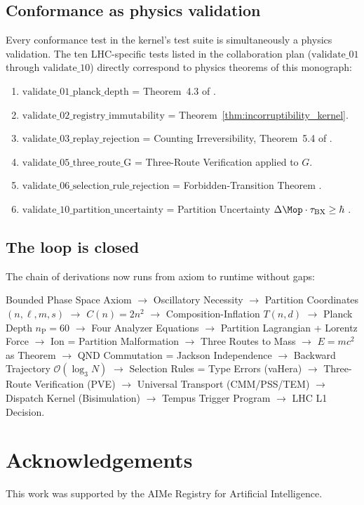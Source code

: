 \documentclass[twocolumn,10pt,a4paper]{article}
\theoremstyle{thmstyle}
\theoremstyle{definition}
\theoremstyle{remark}
\newcommand{\nP}{n_{\mathrm{P}}}
\newcommand{\tBX}{\tau_{\mathrm{BX}}}
\begin{document}
\subsection{Conformance as physics validation}

Every conformance test in the kernel's test suite is simultaneously a
physics validation. The ten LHC-specific tests listed in the collaboration
plan ($\mathrm{validate\_01}$ through $\mathrm{validate\_10}$) directly
correspond to physics theorems of this monograph:
\begin{enumerate}[nosep]
\item $\mathrm{validate\_01\_planck\_depth}$ = Theorem~4.3 of \citet{companion:planck}.
\item $\mathrm{validate\_02\_registry\_immutability}$ = Theorem~\ref{thm:incorruptibility_kernel}.
\item $\mathrm{validate\_03\_replay\_rejection}$ = Counting Irreversibility,
  Theorem~5.4 of \citet{companion:qnd}.
\item $\mathrm{validate\_05\_three\_route\_G}$ = Three-Route Verification
  \citep{companion:verification} applied to $G$.
\item $\mathrm{validate\_06\_selection\_rule\_rejection}$ = Forbidden-Transition
  Theorem \citep{companion:types}.
\item $\mathrm{validate\_10\_partition\_uncertainty}$ = Partition Uncertainty
  $\Delta\Mop \cdot \tBX \geq \hbar$ \citep{companion:spectrometer}.
\end{enumerate}

\subsection{The loop is closed}

The chain of derivations now runs from axiom to runtime without gaps:
\begin{center}
\footnotesize
Bounded Phase Space Axiom
$\to$ Oscillatory Necessity
$\to$ Partition Coordinates $(n,\ell,m,s)$
$\to$ $C(n) = 2n^2$
$\to$ Composition-Inflation $T(n,d)$
$\to$ Planck Depth $\nP = 60$
$\to$ Four Analyzer Equations
$\to$ Partition Lagrangian + Lorentz Force
$\to$ Ion = Partition Malformation
$\to$ Three Routes to Mass
$\to$ $E = mc^2$ as Theorem
$\to$ QND Commutation = Jackson Independence
$\to$ Backward Trajectory $\mathcal{O}(\log_3 N)$
$\to$ Selection Rules = Type Errors (vaHera)
$\to$ Three-Route Verification (PVE)
$\to$ Universal Transport (CMM/PSS/TEM)
$\to$ Dispatch Kernel (Bisimulation)
$\to$ Tempus Trigger Program
$\to$ LHC L1 Decision.
\end{center}

\section*{Acknowledgements}
This work was supported by the AIMe Registry for Artificial Intelligence.



\end{document}
